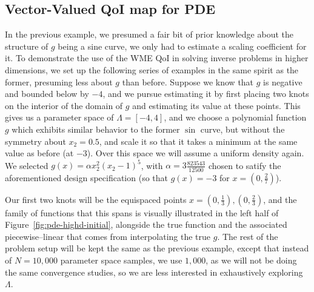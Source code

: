 \subsection{Vector-Valued QoI map for PDE}
In the previous example, we presumed a fair bit of prior knowledge about the structure of $g$ being a sine curve, we only had to estimate a scaling coefficient for it.
To demonstrate the use of the WME QoI in solving inverse problems in higher dimensions, we set up the following series of examples in the same spirit as the former, presuming less about $g$ than before.
Suppose we know that $g$ is negative and bounded below by $-4$, and we pursue estimating it by first placing two knots on the interior of the domain of $g$ and estimating its value at these points.
This gives us a parameter space of $\Lambda = [-4, 4]$, and we choose a polynomial function $g$ which exhibits similar behavior to the former $\sin$ curve, but without the symmetry about $x_2=0.5$, and scale it so that it takes a minimum at the same value as before (at $-3$).
Over this space we will assume a uniform density again.
We selected $g(x) = \alpha x_2^2 (x_2 - 1)^5$, with $\alpha = 3\frac{823543}{12500}$ chosen to satify the aforementioned design specification (so that $g(x)=-3$ for $x=(0,\frac{2}{7})$).

Our first two knots will be the equispaced points $x = (0,\frac{1}{3}), (0,\frac{2}{3})$, and the family of functions that this spans is visually illustrated in the left half of Figure~\ref{fig:pde-highd-initial}, alongside the true function and the associated piecewise--linear that comes from interpolating the true $g$.
The rest of the problem setup will be kept the same as the previous example, except that instead of $N=10,000$ parameter space samples, we use $1,000$, as we will not be doing the same convergence studies, so we are less interested in exhaustively exploring $\Lambda$.


